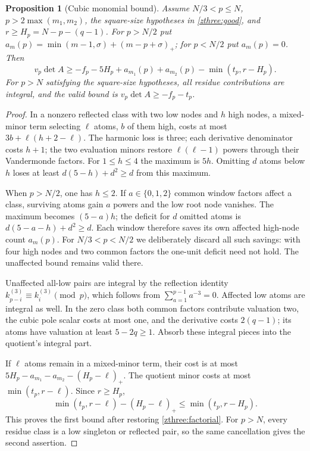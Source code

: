 \documentclass[11pt]{article}
\newtheorem{proposition}[theorem]{Proposition}
\theoremstyle{definition}\newtheorem{definition}[theorem]{Definition}
\theoremstyle{remark}\newtheorem{remark}[theorem]{Remark}
\begin{document}
\begin{proposition}[Cubic monomial bound]\label{zthree:monobound}
Assume $N/3<p\le N$, $p>2\max(m_1,m_2)$, the square-size
hypotheses in \eqref{zthree:good}, and
$r\ge H_p=N-p-(q-1)$. For $p>N/2$ put
$a_m(p)=\min(m-1,\sigma)+(m-p+\sigma)_+$; for $p<N/2$ put
$a_m(p)=0$. Then
\[
 v_p\det A\ge-f_p-5H_p+a_{m_1}(p)+a_{m_2}(p)
                         -\min(t_p,r-H_p).
\]
For $p>N$ satisfying the square-size hypotheses, all residue
contributions are integral, and the valid bound is
$v_p\det A\ge-f_p-t_p$.
\end{proposition}
\begin{proof}
In a nonzero reflected class with two low nodes and $h$ high nodes,
a mixed-minor term selecting $\ell$ atoms, $b$ of them high, costs
at most $3b+\ell(h+2-\ell)$. The harmonic loss is three; each
derivative denominator costs $h+1$; the two evaluation minors restore
$\ell(\ell-1)$ powers through their Vandermonde factors. For
$1\le h\le4$ the maximum is $5h$. Omitting $d$ atoms below $h$
loses at least $d(5-h)+d^2\ge d$ from this maximum.

When $p>N/2$, one has $h\le2$. If $a\in\{0,1,2\}$ common
window factors affect a class, surviving atoms gain $a$ powers and
the low root node vanishes. The maximum becomes $(5-a)h$; the
deficit for $d$ omitted atoms is $d(5-a-h)+d^2\ge d$. Each window
therefore saves its own affected high-node count $a_m(p)$.
For $N/3<p<N/2$ we deliberately discard all such savings: with
four high nodes and two common factors the one-unit deficit need
not hold. The unaffected bound remains valid there.

Unaffected all-low pairs are integral by the reflection identity
$k_{p-i}^{(3)}\equiv k_i^{(3)}\pmod p$, which follows from
$\sum_{a=1}^{p-1}a^{-3}=0$. Affected low atoms are integral as
well. In the zero class both common factors contribute valuation
two, the cubic pole scalar costs at most one, and the derivative
costs $2(q-1)$; its atoms have valuation at least $5-2q\ge1$.
Absorb these integral pieces into the quotient's integral part.

If $\ell$ atoms remain in a mixed-minor term, their cost is at most
$5H_p-a_{m_1}-a_{m_2}-(H_p-\ell)_+$. The quotient minor costs
at most $\min(t_p,r-\ell)$. Since $r\ge H_p$,
\[
 \min(t_p,r-\ell)-(H_p-\ell)_+\le\min(t_p,r-H_p).
\]
This proves the first bound after restoring \eqref{zthree:factorial}.
For $p>N$, every residue class is a low singleton or reflected pair,
so the same cancellation gives the second assertion.
\end{proof}
\end{document}
